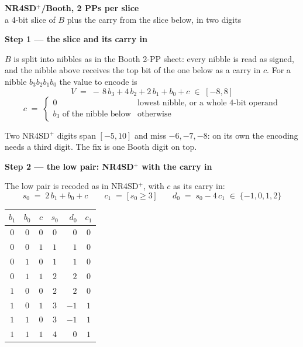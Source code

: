 \documentclass[fleqn]{article}
\begin{document}
\begin{center}
{\LARGE \textbf{NR4SD$^{+}$/Booth, 2 PPs per slice}}\\[4pt]
{\large a 4-bit slice of $B$ plus the carry from the slice below, in two digits}
\end{center}

\vspace{3em}

\noindent\textbf{Step 1 --- the slice and its carry in}

\noindent $B$ is split into nibbles as in the Booth 2-PP sheet: every nibble is read as
signed, and the nibble above receives the top bit of the one below as a carry in $c$.
For a nibble $b_3 b_2 b_1 b_0$ the value to encode is
\[
V \;=\; -\,8\,b_3 + 4\,b_2 + 2\,b_1 + b_0 + c
\;\in\; [-8, 8]
\]
\[
c \;=\; \begin{cases}
0 & \text{lowest nibble, or a whole 4-bit operand}\\
b_3 \text{ of the nibble below} & \text{otherwise}
\end{cases}
\]

\noindent Two NR4SD$^{+}$ digits span $[-5, 10]$ and miss $-6, -7, -8$: on its own the encoding
needs a third digit. The fix is one Booth digit on top.

\vspace{0.5em}

\noindent\textbf{Step 2 --- the low pair: NR4SD$^{+}$ with the carry in}

\noindent The low pair is recoded as in NR4SD$^{+}$, with $c$ as its carry in:
\[
s_0 \;=\; 2\,b_1 + b_0 + c
\qquad
c_1 \;=\; \bigl[\, s_0 \geq 3 \,\bigr]
\qquad
d_0 \;=\; s_0 - 4\,c_1 \;\in\; \{-1, 0, 1, 2\}
\]

\begin{center}
\renewcommand{\arraystretch}{1.35}
\begin{tabular}{c c c | c | r | c}
$b_1$ & $b_0$ & $c$ & $s_0$ & $d_0$ & $c_1$ \\
\hline
$0$ & $0$ & $0$ & $0$ & $0$  & $0$ \\
$0$ & $0$ & $1$ & $1$ & $1$  & $0$ \\
$0$ & $1$ & $0$ & $1$ & $1$  & $0$ \\
$0$ & $1$ & $1$ & $2$ & $2$  & $0$ \\
$1$ & $0$ & $0$ & $2$ & $2$  & $0$ \\
$1$ & $0$ & $1$ & $3$ & $-1$ & $1$ \\
$1$ & $1$ & $0$ & $3$ & $-1$ & $1$ \\
$1$ & $1$ & $1$ & $4$ & $0$  & $1$ \\
\end{tabular}
\end{center}
\end{document}
